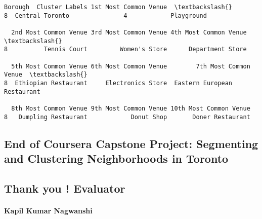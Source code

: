 \documentclass[11pt]{article}
\makeatletter
\newcommand{\boxspacing}{\kern\kvtcb@left@rule\kern\kvtcb@boxsep}
\newcommand{\prompt}[4]{
        \ttfamily\llap{{\color{#2}[#3]:\hspace{3pt}#4}}\vspace{-\baselineskip}
    }
\makeatother
\begin{document}
            \begin{tcolorbox}[breakable, size=fbox, boxrule=.5pt, pad at break*=1mm, opacityfill=0]
\prompt{Out}{outcolor}{49}{\boxspacing}
\begin{Verbatim}[commandchars=\\\{\}]
           Borough  Cluster Labels 1st Most Common Venue  \textbackslash{}
8  Central Toronto               4            Playground

  2nd Most Common Venue 3rd Most Common Venue 4th Most Common Venue  \textbackslash{}
8          Tennis Court         Women's Store      Department Store

  5th Most Common Venue 6th Most Common Venue        7th Most Common Venue  \textbackslash{}
8  Ethiopian Restaurant     Electronics Store  Eastern European Restaurant

  8th Most Common Venue 9th Most Common Venue 10th Most Common Venue
8   Dumpling Restaurant            Donut Shop       Doner Restaurant
\end{Verbatim}
\end{tcolorbox}
        
    \hypertarget{end-of-coursera-capstone-project-segmenting-and-clustering-neighborhoods-in-toronto}{%
\subsection{End of Coursera Capstone Project: Segmenting and Clustering
Neighborhoods in
Toronto}\label{end-of-coursera-capstone-project-segmenting-and-clustering-neighborhoods-in-toronto}}

\hypertarget{thank-you-evaluator}{%
\subsection{Thank you ! Evaluator}\label{thank-you-evaluator}}

\hypertarget{kapil-kumar-nagwanshi}{%
\paragraph{Kapil Kumar Nagwanshi}\label{kapil-kumar-nagwanshi}}


    
    
    
\end{document}
